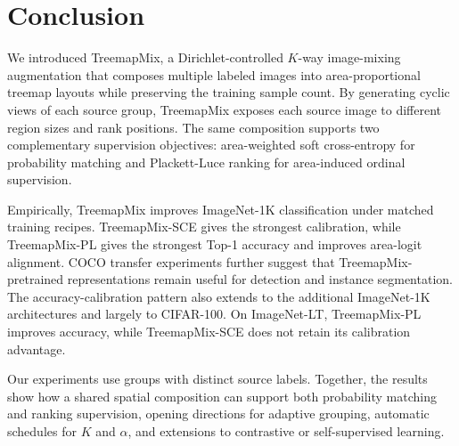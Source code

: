 \section{Conclusion}

We introduced TreemapMix, a Dirichlet-controlled $K$-way image-mixing
augmentation that composes multiple labeled images into area-proportional
treemap layouts while preserving the training sample count. By generating
cyclic views of each source group, TreemapMix exposes each source image to
different region sizes and rank positions. The same composition supports two
complementary supervision objectives: area-weighted soft cross-entropy for probability
matching and Plackett-Luce ranking for area-induced ordinal supervision.

Empirically, TreemapMix improves ImageNet-1K classification under matched
training recipes. TreemapMix-SCE gives the strongest calibration, while
TreemapMix-PL gives the strongest Top-1 accuracy and improves area-logit
alignment. COCO transfer experiments further suggest that TreemapMix-pretrained
representations remain useful for detection and instance segmentation.
The accuracy-calibration pattern also extends to the additional ImageNet-1K
architectures and largely to CIFAR-100. On ImageNet-LT, TreemapMix-PL improves
accuracy, while TreemapMix-SCE does not retain its calibration advantage.

Our experiments use groups with distinct source labels. Together, the results
show how a shared spatial composition can support both probability matching
and ranking supervision, opening directions for adaptive grouping, automatic
schedules for $K$ and $\alpha$, and extensions to contrastive or
self-supervised learning.
